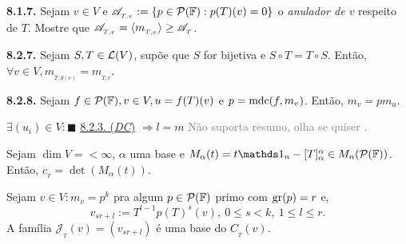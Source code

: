 \begin{exercise}
    \textbf{8.1.7.} Sejam \(v \in V\) e \(\mathscr{A}_{_{T,v}} := \{p \in \mathcal{P}(\mathbb{F}) : p(T)(v) = 0\}\) o \emph{anulador de \(v\)} respeito de \(T\). Mostre que \(\mathscr{A}_{_{T,v}}= \langle m_{_{T,v}}\rangle \geq \mathscr{A}_{_T}\). 
\end{exercise}
\hypertarget{lemma827}{}
\begin{lemma}
    \textbf{8.2.7.} Sejam \(S, T \in \mathcal{L}(V)\), supõe que \(S\) for bijetiva e \(S \circ T = T \circ S\). Então, \(\forall v \in V, m_{_{T, S(v)}} = m_{_{T,v}} \). 
\end{lemma}

\begin{lemma}
    \textbf{8.2.8.} Sejam \(f \in \mathcal{P}(\mathbb{F}), v \in V, u = f(T)(v) \) e \(p = \operatorname{mdc} (f, m_v)\). Então, \(m_v = pm_u\).   
\end{lemma}

\begin{tcolorbox}[colframe=gray, colback=white, boxrule=0.8pt]
    \centering \(\exists (u_i) \in V : \blacksquare\) \hyperlink{thmDC}{8.2.3. (\emph{DC})} \(\Rightarrow l = m\)
    \tcblower 
\textcolor{gray}{Não suporta resumo, olha se quiser \cite[Pág. 273]{MA719}. }
\end{tcolorbox} 

\begin{proposition}
    Sejam \(\dim V = < \infty\), \(\alpha\) uma base e \(M_\alpha(t) = t\id_n - [T]^\alpha_\alpha \in M_n(\Pol) \). Então, \(c_{_T} = \det (M_\alpha (t)) \).  
\end{proposition}

\begin{proposition}
    Sejam \(v \in V: m_v = p^k\) pra algum \(p \in \mathcal{P}(\mathbb{F})\) primo com \(\operatorname{gr} (p) = r\) e,   
    \[v_{sr+l} := T^{l-1}p(T)^s(v), \ 0 \leq  s < k, \ 1 \leq l \leq r. \] 
    A família \(\mathscr{J}_{_T}(v) = (v_{sr+ l})\) é uma base do \(C_{_{T}}(v)\). 
\end{proposition}

